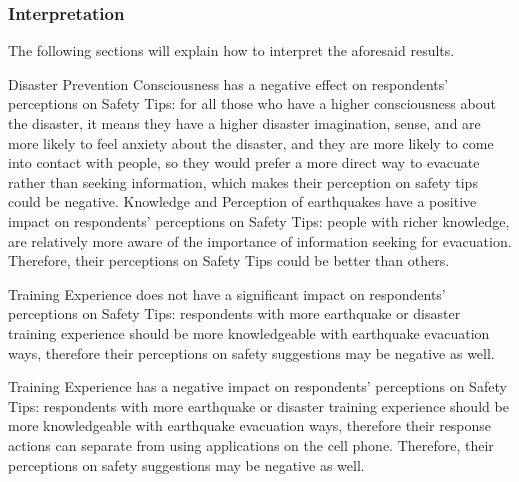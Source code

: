 \subsubsection{Interpretation}
The following sections will explain how to interpret the aforesaid results. 

Disaster Prevention Consciousness has a negative effect on respondents' perceptions on Safety Tips: for all those who have a higher consciousness about the disaster, it means they have a higher disaster imagination, sense, and are more likely to feel anxiety about the disaster, and they are more likely to come into contact with people, so they would prefer a more direct way to evacuate rather than seeking information, which makes their perception on safety tips could be negative.
Knowledge and Perception of earthquakes have a positive impact on respondents' perceptions on Safety Tips: people with richer knowledge, are relatively more aware of the importance of information seeking for evacuation. Therefore, their perceptions on Safety Tips could be better than others.

Training Experience does not have a significant impact on respondents' perceptions on Safety Tips: respondents with more earthquake or disaster training experience should be more knowledgeable with earthquake evacuation ways, therefore their perceptions on safety suggestions may be negative as well. 

Training Experience has a negative impact on respondents' perceptions on Safety Tips: respondents with more earthquake or disaster training experience should be more knowledgeable with earthquake evacuation ways, therefore their response actions can separate from using applications on the cell phone. Therefore, their perceptions on safety suggestions may be negative as well. 













































